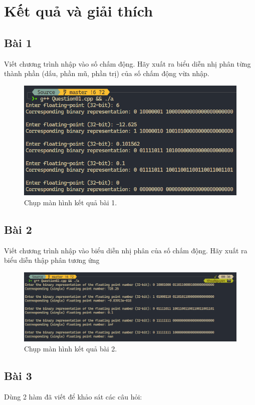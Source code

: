 \newpage
\section{Kết quả và giải thích}
\subsection{Bài 1}
Viết chương trình nhập vào số chấm động. Hãy xuất ra biểu diễn nhị phân từng thành phần (dấu, phần mũ, phần trị) của số chấm động vừa nhập.

\begin{figure}[H]
	\centering
	\includegraphics[width=\textwidth]{images/img1.PNG}
	\caption{Chụp màn hình kết quả bài 1.}
\end{figure}

\subsection{Bài 2}

Viết chương trình nhập vào biểu diễn nhị phân của số chấm động. Hãy xuất ra biểu diễn thập
phân tương ứng

\begin{figure}[H]
	\centering
	\includegraphics[width=\textwidth]{images/img2.PNG}
	\caption{Chụp màn hình kết quả bài 2.}
\end{figure}

\newpage
\subsection{Bài 3}
Dùng 2 hàm đã viết để khảo sát các câu hỏi:

